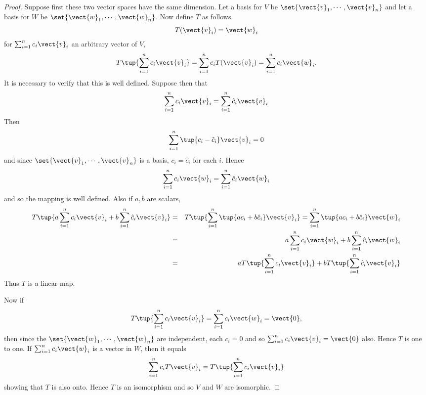 \begin{proof}Suppose first these two vector spaces have the same
dimension. Let a basis for $V$ be $\set{
\vect{v}_{1},\cdots ,\vect{v}_{n}} $ and let a basis for $W$ be $
\set{\vect{w}_{1},\cdots ,\vect{w}_{n}} $. Now define $T$ as
follows. 
\begin{equation*}
T(\vect{v}_{i})=\vect{w}_{i}
\end{equation*}
for $\sum_{i=1}^{n}c_{i}\vect{v}_{i}$ an arbitrary vector of $V$,%
\begin{equation*}
T\tup{\sum_{i=1}^{n}c_{i}\vect{v}_{i}} = \sum_{i=1}^{n}c_{i}T
(\vect{v}_{i})=\sum_{i=1}^{n}c_{i}\vect{w}_{i}.
\end{equation*}
It is necessary to verify that this is well defined. Suppose then that 
\begin{equation*}
\sum_{i=1}^{n}c_{i}\vect{v}_{i}=\sum_{i=1}^{n}\hat{c}_{i}\vect{v}_{i}
\end{equation*}
Then 
\begin{equation*}
\sum_{i=1}^{n}\tup{c_{i}-\hat{c}_{i}} \vect{v}_{i}=0
\end{equation*}
and since $\set{\vect{v}_{1},\cdots ,\vect{v}_{n}} $ is a basis, $
c_{i}=\hat{c}_{i}$ for each $i$. Hence 
\begin{equation*}
\sum_{i=1}^{n}c_{i}\vect{w}_{i}=\sum_{i=1}^{n}\hat{c}_{i}\vect{w}_{i}
\end{equation*}
and so the mapping is well defined. Also if $a,b$ are scalars, 
\begin{eqnarray*}
T\tup{a\sum_{i=1}^{n}c_{i}\vect{v}_{i}+b\sum_{i=1}^{n}\hat{c}_{i}\vect{v}
_{i}} &=&T\tup{\sum_{i=1}^{n}\tup{ac_{i}+b\hat{c}_{i}} \vect{v
}_{i}} =\sum_{i=1}^{n}\tup{ac_{i}+b\hat{c}_{i}} \vect{w}_{i} \\
&=&a\sum_{i=1}^{n}c_{i}\vect{w}_{i}+b\sum_{i=1}^{n}\hat{c}_{i}\vect{w}_{i} \\
&=&aT\tup{\sum_{i=1}^{n}c_{i}\vect{v}_{i}} +bT\tup{\sum_{i=1}^{n}
\hat{c}_{i}\vect{v}_{i}}
\end{eqnarray*}
Thus $T$ is a linear map.

Now if 
\begin{equation*}
T\tup{\sum_{i=1}^{n}c_{i}\vect{v}_{i}} =\sum_{i=1}^{n}c_{i}\vect{w}
_{i}=\vect{0},
\end{equation*}
then since the $\set{\vect{w}_{1},\cdots ,\vect{w}_{n}} $ are
independent, each $c_{i}=0$ and so $\sum_{i=1}^{n}c_{i}\vect{v}_{i}=\vect{0}$
also. Hence $T$ is one to one. If $\sum_{i=1}^{n}c_{i}\vect{w}_{i}$ is a
vector in $W$, then it equals 
\begin{equation*}
\sum_{i=1}^{n}c_{i}T\vect{v}_{i}=T\tup{\sum_{i=1}^{n}c_{i}\vect{v}_{i}}
\end{equation*}
showing that $T$ is also onto. Hence $T$ is an isomorphism and so $V$ and $W$
are isomorphic.


\end{proof}
